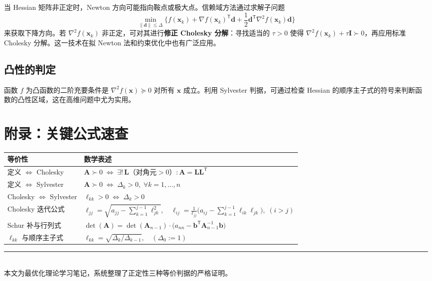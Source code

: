 \documentclass[12pt,a4paper]{article}
\theoremstyle{mystyle}
\theoremstyle{proofstyle}
\theoremstyle{definition}
\theoremstyle{remark}
\newcommand{\T}{^{\mathsf{T}}}
\newcommand{\x}{\mathbf{x}}
\newcommand{\A}{\mathbf{A}}
\newcommand{\Lmat}{\mathbf{L}}
\newcommand{\I}{\mathbf{I}}
\begin{document}
当 Hessian 矩阵非正定时，Newton 方向可能指向鞍点或极大点。信赖域方法通过求解子问题
\[
    \min_{\|\mathbf{d}\| \le \Delta} \Big\{ f(\x_k) + \nabla f(\x_k)\T\mathbf{d} + \frac{1}{2}\mathbf{d}\T\nabla^2 f(\x_k)\mathbf{d} \Big\}
\]
来获取下降方向。若 $\nabla^2 f(\x_k)$ 非正定，可对其进行\textbf{修正 Cholesky 分解}：寻找适当的 $\tau > 0$ 使得 $\nabla^2 f(\x_k) + \tau\I \succ 0$，再应用标准 Cholesky 分解。这一技术在拟 Newton 法和约束优化中也有广泛应用。

\subsection{凸性的判定}

函数 $f$ 为凸函数的二阶充要条件是 $\nabla^2 f(\x) \succeq 0$ 对所有 $\x$ 成立。利用 Sylvester 判据，可通过检查 Hessian 的顺序主子式的符号来判断函数的凸性区域，这在高维问题中尤为实用。

\section{附录：关键公式速查}

\begin{center}
\begin{tabular}{@{}ll@{}}
\toprule
\textbf{等价性} & \textbf{数学表述} \\
\midrule
定义 $\Leftrightarrow$ Cholesky & $\A \succ 0 \;\Longleftrightarrow\; \exists!\,\Lmat\text{（对角元}>0\text{）}:\A=\Lmat\Lmat\T$ \\[6pt]
定义 $\Leftrightarrow$ Sylvester & $\A \succ 0 \;\Longleftrightarrow\; \Delta_k>0,\;\forall k=1,\dots,n$ \\[6pt]
Cholesky $\Leftrightarrow$ Sylvester & $\ell_{kk}>0 \;\Longleftrightarrow\; \Delta_k>0$ \\[6pt]
Cholesky 迭代公式 & $\ell_{jj} = \sqrt{a_{jj} - \sum_{k=1}^{j-1}\ell_{jk}^2},\quad
   \ell_{ij} = \frac{1}{\ell_{jj}}\Big(a_{ij} - \sum_{k=1}^{j-1}\ell_{ik}\ell_{jk}\Big),\;(i>j)$ \\[8pt]
Schur 补与行列式 & $\det(\A) = \det(\A_{n-1})\cdot\big(a_{nn} - \mathbf{b}\T\A_{n-1}^{-1}\mathbf{b}\big)$ \\[6pt]
$\ell_{kk}$ 与顺序主子式 & $\ell_{kk} = \sqrt{\Delta_k/\Delta_{k-1}},\quad(\Delta_0:=1)$ \\[6pt]
\bottomrule
\end{tabular}
\end{center}

\vspace{1cm}

\begin{center}
\rule{0.5\textwidth}{0.4pt}\\[6pt]
{\small 本文为最优化理论学习笔记，系统整理了正定性三种等价判据的严格证明。}
\end{center}
\end{document}
